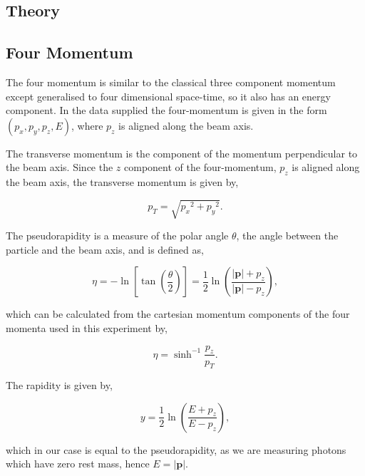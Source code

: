 \documentclass[11pt]{amsart}
\begin{document}
\begin{multicols}{2}
\section{Theory}

\subsection{Four Momentum}
\label{sec:fourmomentum}

The four momentum is similar to the classical three component momentum except generalised to four dimensional space-time, so it also has an energy component. \cite{kinematics} In the data supplied the four-momentum is given in the form $(p_x, p_y, p_z, E)$, where $p_z$ is aligned along the beam axis.

The transverse momentum is the component of the momentum perpendicular to the beam axis. Since the $z$ component of the four-momentum, $p_z$ is aligned along the beam axis, the transverse momentum is given by,

\begin{equation}
  \label{eq:transverse}
  p_T = \sqrt{{p_x}^2 + {p_y}^2}.
\end{equation}

The pseudorapidity is a measure of the polar angle $\theta$, the angle between the particle and the beam axis, and is defined as,

\begin{equation}
  \label{eq:pseudorapdity2}
  \eta = -\ln{\left[\tan{\left(\frac{\theta}{2}\right)}\right]} = \frac{1}{2}\ln{\left(\frac{|\mathbf{p}|+p_z}{|\mathbf{p}|-p_z}\right)},
\end{equation}

\cite{kinematics}

which can be calculated from the cartesian momentum components of the four momenta used in this experiment by,

\begin{equation}
  \label{eq:pseudorapidity}
  \eta = \sinh^{-1} \frac{p_z}{p_T}.
\end{equation}

The rapidity is given by,

\begin{equation}
  \label{eq:rapidity}
  y = \frac{1}{2}\ln{\left(\frac{E + p_z}{E - p_z}\right)},
\end{equation}

which in our case is equal to the pseudorapidity, as we are measuring photons which have zero rest mass, hence $E = |\mathbf{p}|$.


\end{multicols}
\end{document}

